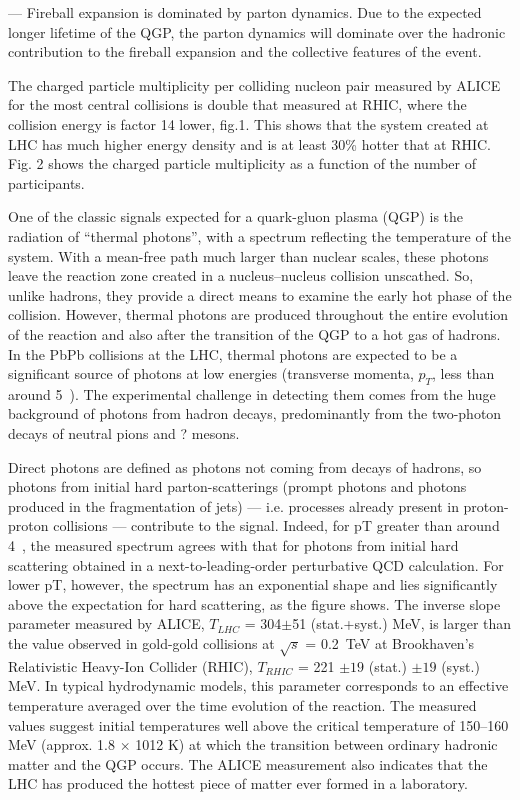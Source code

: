 --- Fireball expansion is dominated by parton dynamics.
Due to the expected longer lifetime of the QGP, the parton dynamics will dominate over the hadronic contribution to the fireball expansion and the collective features of the event.

The charged particle multiplicity per colliding nucleon pair measured by ALICE for the most central collisions is double that measured at RHIC, where the collision energy is factor 14 lower, fig.1. This shows that the system created at LHC has much higher energy density and is at least 30\% hotter that at RHIC. Fig. 2 shows the charged particle multiplicity as a function of the number of participants. 

One of the classic signals expected for a quark-gluon plasma (QGP) is the radiation of ``thermal photons'', with a spectrum reflecting the temperature of the system. With a mean-free path much larger than nuclear scales, these photons leave the reaction zone created in a nucleus–nucleus collision unscathed. So, unlike hadrons, they provide a direct means to examine the early hot phase of the collision. However, thermal photons are produced throughout the entire evolution of the reaction and also after the transition of the QGP to a hot gas of hadrons. In the PbPb collisions at the LHC, thermal photons are expected to be a significant source of photons at low energies (transverse momenta, $p_{T}$, less than around 5~\GeVoverC{}). The experimental challenge in detecting them comes from the huge background of photons from hadron decays, predominantly from the two-photon decays of neutral pions and ? mesons. 

Direct photons are defined as photons not coming from decays of hadrons, so photons from initial hard parton-scatterings (prompt photons and photons produced in the fragmentation of jets) --- i.e. processes already present in proton-proton collisions --- contribute to the signal. Indeed, for pT greater than around 4~\GeVoverC{}, the measured spectrum agrees with that for photons from initial hard scattering obtained in a next-to-leading-order perturbative QCD calculation. For lower pT, however, the spectrum has an exponential shape and lies significantly above the expectation for hard scattering, as the figure shows. The inverse slope parameter measured by ALICE, $T_{LHC}$ = 304$\pm$51 (stat.+syst.) MeV, is larger than the value observed in gold-gold collisions at $\sqrt{s}$ = 0.2~TeV at Brookhaven’s Relativistic Heavy-Ion Collider (RHIC), $T_{RHIC}$ = 221 $\pm 19$ (stat.) $\pm 19$ (syst.) MeV. In typical hydrodynamic models, this parameter corresponds to an effective temperature averaged over the time evolution of the reaction. The measured values suggest initial temperatures well above the critical temperature of 150--160 MeV (approx. 1.8 $\times$ 1012 K) at which the transition between ordinary hadronic matter and the QGP occurs. The ALICE measurement also indicates that the LHC has produced the hottest piece of matter ever formed in a laboratory. 

